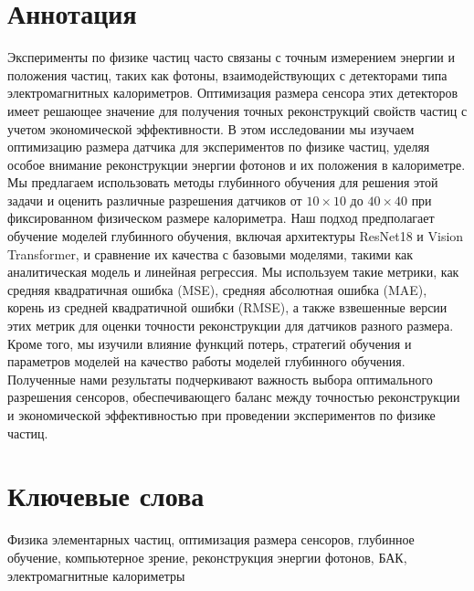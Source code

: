 \documentclass[a4paper,12pt]{extarticle}
\begin{document}
\newpage
\setcounter{page}{2}

{
	\hypersetup{linkcolor=black}
	\tableofcontents
}

\newpage

\newpage

\section*{Аннотация}   %
Эксперименты по физике частиц часто связаны с точным измерением энергии и положения частиц, таких как фотоны, взаимодействующих с детекторами типа электромагнитных калориметров. Оптимизация размера сенсора этих детекторов имеет решающее значение для получения точных реконструкций свойств частиц с учетом экономической эффективности. В этом исследовании мы изучаем оптимизацию размера датчика для экспериментов по физике частиц, уделяя особое внимание реконструкции энергии фотонов и их положения в калориметре. Мы предлагаем использовать методы глубинного обучения для решения этой задачи и оценить различные разрешения датчиков от $10 \times 10$ до $40 \times 40$ при фиксированном физическом размере калориметра. Наш подход предполагает обучение моделей глубинного обучения, включая архитектуры ResNet18 и Vision Transformer, и сравнение их качества с базовыми моделями, такими как аналитическая модель и линейная регрессия. Мы используем такие метрики, как средняя квадратичная ошибка (MSE), средняя абсолютная ошибка (MAE), корень из средней квадратичной ошибки (RMSE), а также взвешенные версии этих метрик для оценки точности реконструкции для датчиков разного размера. Кроме того, мы изучили влияние функций потерь, стратегий обучения и параметров моделей на качество работы моделей глубинного обучения. Полученные нами результаты подчеркивают важность выбора оптимального разрешения сенсоров, обеспечивающего баланс между точностью реконструкции и экономической эффективностью при проведении экспериментов по физике частиц.


\section*{Ключевые слова}
Физика элементарных частиц, оптимизация размера сенсоров, глубинное обучение, компьютерное зрение, реконструкция энергии фотонов, БАК, электромагнитные калориметры
\end{document}
